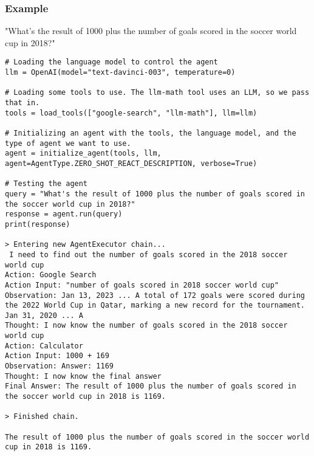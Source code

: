 \begin{frame}[fragile]
\frametitle{Example}
"What's the result of 1000 plus the number of goals scored in the soccer world cup in 2018?"

\begin{lstlisting}
# Loading the language model to control the agent
llm = OpenAI(model="text-davinci-003", temperature=0)

# Loading some tools to use. The llm-math tool uses an LLM, so we pass that in.
tools = load_tools(["google-search", "llm-math"], llm=llm)

# Initializing an agent with the tools, the language model, and the type of agent we want to use.
agent = initialize_agent(tools, llm, agent=AgentType.ZERO_SHOT_REACT_DESCRIPTION, verbose=True)

# Testing the agent
query = "What's the result of 1000 plus the number of goals scored in the soccer world cup in 2018?"
response = agent.run(query)
print(response)

> Entering new AgentExecutor chain...
 I need to find out the number of goals scored in the 2018 soccer world cup
Action: Google Search
Action Input: "number of goals scored in 2018 soccer world cup"
Observation: Jan 13, 2023 ... A total of 172 goals were scored during the 2022 World Cup in Qatar, marking a new record for the tournament. Jan 31, 2020 ... A 
Thought: I now know the number of goals scored in the 2018 soccer world cup
Action: Calculator
Action Input: 1000 + 169
Observation: Answer: 1169
Thought: I now know the final answer
Final Answer: The result of 1000 plus the number of goals scored in the soccer world cup in 2018 is 1169.

> Finished chain.

The result of 1000 plus the number of goals scored in the soccer world cup in 2018 is 1169.
\end{lstlisting}

\end{frame}


